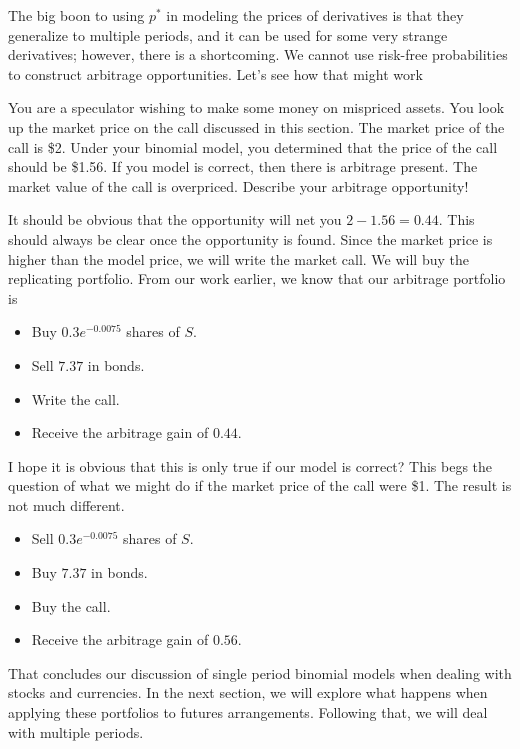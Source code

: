\documentclass{ximera}
\begin{document}
The big boon to using $p^*$ in modeling the prices of derivatives is that they generalize to multiple periods, and it can be used for some very strange derivatives; however, there is a shortcoming. We cannot use risk-free probabilities to construct arbitrage opportunities. Let's see how that might work

\begin{example}
You are a speculator wishing to make some money on mispriced assets. You look up the market price on the call discussed in this section. The market price of the call is \$2. Under your binomial model, you determined that the price of the call should be \$1.56. If you model is correct, then there is arbitrage present. The market value of the call is overpriced. Describe your arbitrage opportunity!
\end{example}

\begin{solution}
It should be obvious that the opportunity will net you $2-1.56=0.44$. This should always be clear once the opportunity is found. Since the market price is higher than the model price, we will write the market call. We will buy the replicating portfolio. From our work earlier, we know that our arbitrage portfolio is
	\begin{itemize}
	\item Buy $0.3e^{-0.0075}$ shares of $S$.
	\item Sell $7.37$ in bonds.
	\item Write the call. 
	\item Receive the arbitrage gain of $0.44$.
	\end{itemize}
\end{solution}

I hope it is obvious that this is only true if our model is correct? This begs the question of what we might do if the market price of the call were \$1. The result is not much different.

\begin{itemize}
\item Sell $0.3e^{-0.0075}$ shares of $S$.
\item Buy $7.37$ in bonds.
\item Buy the call.
\item Receive the arbitrage gain of $0.56$.
\end{itemize}

That concludes our discussion of single period binomial models when dealing with stocks and currencies. In the next section, we will explore what happens when applying these portfolios to futures arrangements. Following that, we will deal with multiple periods. 
\end{document}
